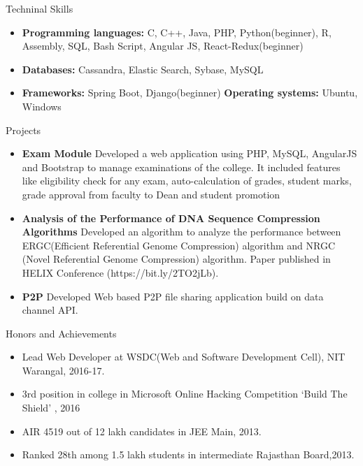 \documentclass[]{mcdowellcv}
\begin{document}
\begin{cvsection}{Techninal Skills}
	\begin{cvsubsection}{}{}{}
		\begin{itemize}
			\item \textbf{Programming languages:}  C, C++, Java, PHP, Python(beginner), R, Assembly, SQL, Bash Script, Angular JS, React-Redux(beginner)
			\item \textbf{Databases:} Cassandra, Elastic Search, Sybase, MySQL
			\item \textbf{Frameworks:} Spring Boot, Django(beginner)  \textbf{Operating systems:}  Ubuntu, Windows 
		 
		\end{itemize}
	\end{cvsubsection}
\end{cvsection}
\begin{cvsection}{Projects}
	\begin{cvsubsection}{}{}{}
		\begin{itemize}
			\setlength\itemsep{3pt}
		\item {\textbf{Exam Module}} Developed a web application using PHP, MySQL, AngularJS and Bootstrap to manage examinations of the college. It included features like eligibility check for any exam, auto-calculation of grades, student marks, grade approval from faculty to Dean and student promotion
			\item \textbf{Analysis of the Performance of DNA Sequence Compression Algorithms} Developed an algorithm to analyze the performance between ERGC(Efficient Referential Genome Compression) algorithm and NRGC (Novel Referential Genome Compression) algorithm. Paper published in HELIX Conference (https://bit.ly/2TO2jLb).
			\item \textbf{P2P} Developed Web based P2P file sharing application build on data channel API.
		\end{itemize}
	\end{cvsubsection}
\end{cvsection}
\begin{cvsection}{Honors and Achievements}
	\begin{cvsubsection}{}{}{}
		\begin{itemize}
			\setlength\itemsep{3pt} 
			\item Lead Web Developer at WSDC(Web and Software Development Cell), NIT Warangal, 2016-17.
			\item 3rd position in college in Microsoft Online Hacking Competition ‘Build The Shield' , 2016
			\item AIR 4519 out of 12 lakh candidates in JEE Main, 2013.
			\item Ranked 28th among 1.5 lakh students in intermediate Rajasthan Board,2013.
            
		\end{itemize}
	\end{cvsubsection}
\end{cvsection}
\end{document}
